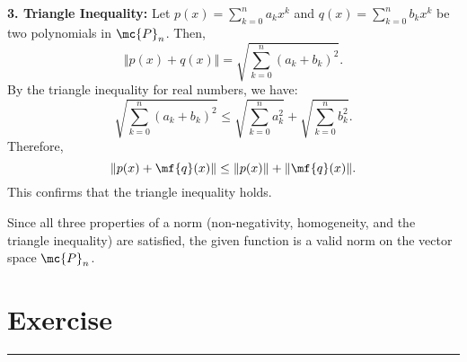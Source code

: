 \begin{enumerate}
\begin{boxedstuff}
        \textbf{3. Triangle Inequality:} 
        Let $p(x) = \sum_{k=0}^n a_k x^k$ and $q(x) = \sum_{k=0}^n b_k x^k$ be two polynomials in $\mc{P}_n$. Then,
        \[
        \Vert p(x) + q(x) \Vert = \sqrt{\sum_{k=0}^{n} (a_k + b_k)^2}.
        \]
        By the triangle inequality for real numbers, we have:
        \[
        \sqrt{\sum_{k=0}^{n} (a_k + b_k)^2} \leq \sqrt{\sum_{k=0}^{n} a_k^2} + \sqrt{\sum_{k=0}^{n} b_k^2}.
        \]
        Therefore, 
        \[
        \Vert p(x) + \mf{q}(x) \Vert \leq \Vert p(x) \Vert + \Vert \mf{q}(x) \Vert.
        \]
        This confirms that the triangle inequality holds.

        Since all three properties of a norm (non-negativity, homogeneity, and the triangle inequality) are satisfied, the given function is a valid norm on the vector space $\mc{P}_n$.
    \end{boxedstuff}
\end{enumerate}

\section{Exercise}
\vspace{-0.5cm}
\begin{center}
    \rule{\textwidth}{1pt}
\end{center}

